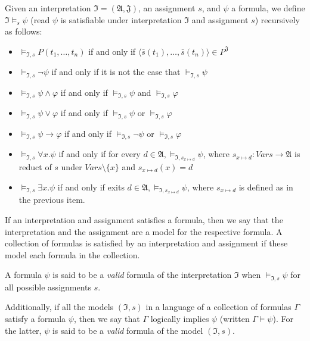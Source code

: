 \begin{definition}
  Given an interpretation $\mathfrak{I} = (\mathfrak{A}, \mathfrak{J})$, an assignment $s$, and $\psi$ a formula, we define $\mathfrak{I} \models_s \psi$ (read $\psi$ is satisfiable under interpretation $\mathfrak{I}$ and assignment $s$) recursively as follows:
  \begin{itemize}
    \item $\models_{\mathfrak{I}, s} P(t_1, \dots, t_n)$ 
      if and only if 
      $\langle
      \bar{s}(t_1), \dots, \bar{s}(t_n) \rangle 
      \in P^{\mathfrak{J}}$
    \item $\models_{\mathfrak{I}, s} \neg \psi$ if and only if  it is not the case that $\models_{\mathfrak{I}, s}   \psi$
    \item $\models_{\mathfrak{I}, s} \psi \land \varphi$ if and only if $\models_{\mathfrak{I}, s}  \psi$ and $   \models_{\mathfrak{I}, s}  \varphi$
    \item $   \models_{\mathfrak{I}, s}  \psi \lor \varphi$ if and only if $   \models_{\mathfrak{I}, s}  \psi$ or $   \models_{\mathfrak{I}, s}  \varphi$
    \item $   \models_{\mathfrak{I}, s}  \psi \rightarrow \varphi$ if and only if $   \models_{\mathfrak{I}, s}  \neg \psi$ or $   \models_{\mathfrak{I}, s}  \varphi$
    \item $   \models_{\mathfrak{I}, s}  \forall x . \psi$ if and only if for every $d \in \mathfrak{A},    \models_{\mathfrak{I}, s_{x \mapsto d}} \psi$, where $s_{x \mapsto d} : Vars \rightarrow \mathfrak{A}$ is reduct of $s$ under $Vars \setminus \{x\}$ and $s_{x \mapsto d}(x) = d$
    \item $   \models_{\mathfrak{I}, s}  \exists x . \psi$ if and only if exits $d \in \mathfrak{A},    \models_{\mathfrak{I}, s_{x \mapsto d}} \psi$, where $s_{x \mapsto d}$ is defined as in the previous item.
  \end{itemize}

  If an interpretation and assignment satisfies a formula, then we 
  say that the interpretation and the assignment are a model for the 
  respective formula. A collection of formulas is satisfied by 
  an interpretation and assignment if these model each formula 
  in the collection.

  A formula $\psi$ is said to be a \emph{valid} 
  formula of the interpretation $\mathfrak{I}$ 
  when $\models_{\mathfrak{I}, s} \psi$ for all 
  possible assignments $s$.

  Additionally, if all the models $(\mathfrak{I},
  s)$ in a language of a collection of formulas 
  $\Gamma$ satisfy a formula $\psi$, then we say 
  that $\Gamma$ logically implies $\psi$ 
  (written $\Gamma \models \psi$). For the 
  latter, $\psi$ is said to be a \emph{valid} 
  formula of the model $(\mathfrak{I}, s)$.

\end{definition}

